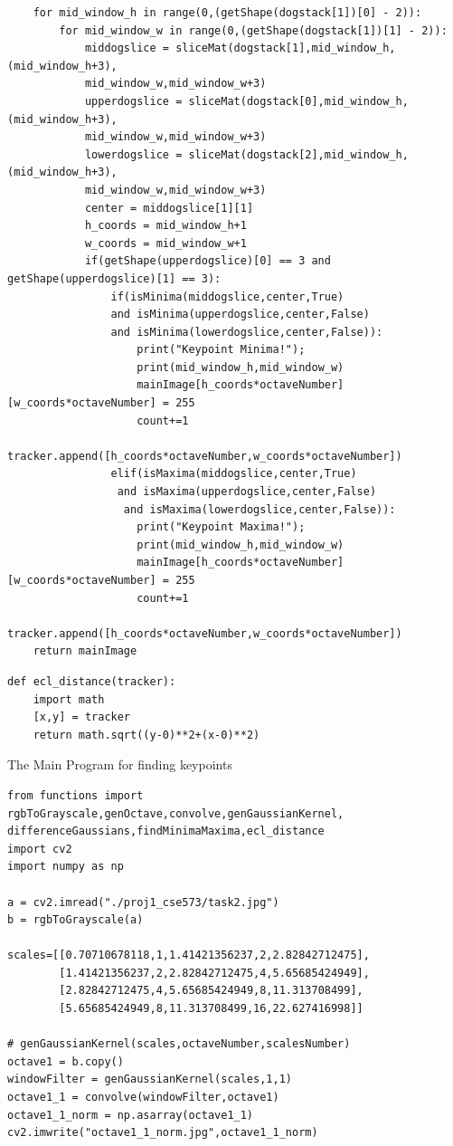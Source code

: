 \documentclass[12pt]{article}
\newenvironment{QandA}
{
	\begin{enumerate}[label=\normalfont\arabic*.,leftmargin=2em,rightmargin=2em]\normalfont
	}
	{
	\end{enumerate}
}
\newenvironment{codelalala}{}{}
\newenvironment{answered}{\setlength{\parindent}{1em}\par\normalfont}{}
\begin{document}
\begin{QandA}
\begin{answered}
\begin{codelalala}
\begin{verbatim}
    for mid_window_h in range(0,(getShape(dogstack[1])[0] - 2)):
        for mid_window_w in range(0,(getShape(dogstack[1])[1] - 2)):
            middogslice = sliceMat(dogstack[1],mid_window_h,(mid_window_h+3),
            mid_window_w,mid_window_w+3)
            upperdogslice = sliceMat(dogstack[0],mid_window_h,(mid_window_h+3),
            mid_window_w,mid_window_w+3)
            lowerdogslice = sliceMat(dogstack[2],mid_window_h,(mid_window_h+3),
            mid_window_w,mid_window_w+3)
            center = middogslice[1][1]
            h_coords = mid_window_h+1
            w_coords = mid_window_w+1
            if(getShape(upperdogslice)[0] == 3 and getShape(upperdogslice)[1] == 3):
                if(isMinima(middogslice,center,True) 
                and isMinima(upperdogslice,center,False) 
                and isMinima(lowerdogslice,center,False)):
                    print("Keypoint Minima!");
                    print(mid_window_h,mid_window_w)
                    mainImage[h_coords*octaveNumber][w_coords*octaveNumber] = 255
                    count+=1
                    tracker.append([h_coords*octaveNumber,w_coords*octaveNumber])
                elif(isMaxima(middogslice,center,True)
                 and isMaxima(upperdogslice,center,False)
                  and isMaxima(lowerdogslice,center,False)):
                    print("Keypoint Maxima!");
                    print(mid_window_h,mid_window_w)
                    mainImage[h_coords*octaveNumber][w_coords*octaveNumber] = 255
                    count+=1
                    tracker.append([h_coords*octaveNumber,w_coords*octaveNumber])             
    return mainImage
\end{verbatim}
\begin{verbatim}
def ecl_distance(tracker):
    import math
    [x,y] = tracker
    return math.sqrt((y-0)**2+(x-0)**2)
\end{verbatim}
The Main Program for finding keypoints
\begin{verbatim}
from functions import rgbToGrayscale,genOctave,convolve,genGaussianKernel,
differenceGaussians,findMinimaMaxima,ecl_distance
import cv2
import numpy as np

a = cv2.imread("./proj1_cse573/task2.jpg")
b = rgbToGrayscale(a)

scales=[[0.70710678118,1,1.41421356237,2,2.82842712475],
        [1.41421356237,2,2.82842712475,4,5.65685424949],
        [2.82842712475,4,5.65685424949,8,11.313708499],
        [5.65685424949,8,11.313708499,16,22.627416998]]

# genGaussianKernel(scales,octaveNumber,scalesNumber)
octave1 = b.copy()
windowFilter = genGaussianKernel(scales,1,1)
octave1_1 = convolve(windowFilter,octave1)
octave1_1_norm = np.asarray(octave1_1)
cv2.imwrite("octave1_1_norm.jpg",octave1_1_norm)


\end{verbatim}
\end{codelalala}
\end{answered}
\end{QandA}
\end{document}
